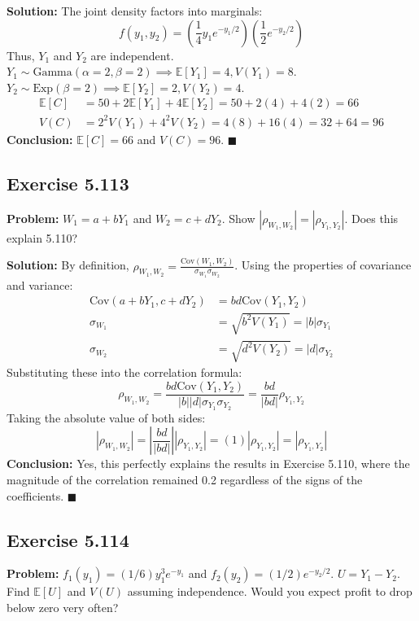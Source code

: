 \documentclass[11pt, a4paper]{article}
\theoremstyle{definition}
\theoremstyle{remark}
\newcommand{\E}{\mathbb{E}}
\begin{document}
\textbf{Solution:}
The joint density factors into marginals:
\[ f(y_1, y_2) = \left( \frac{1}{4} y_1 e^{-y_1/2} \right) \left( \frac{1}{2} e^{-y_2/2} \right) \]
Thus, $Y_1$ and $Y_2$ are independent.
$Y_1 \sim \text{Gamma}(\alpha=2, \beta=2) \implies \E[Y_1] = 4, V(Y_1) = 8$.
$Y_2 \sim \text{Exp}(\beta=2) \implies \E[Y_2] = 2, V(Y_2) = 4$.
\begin{align*}
\E[C] &= 50 + 2\E[Y_1] + 4\E[Y_2] = 50 + 2(4) + 4(2) = 66 \\
V(C) &= 2^2 V(Y_1) + 4^2 V(Y_2) = 4(8) + 16(4) = 32 + 64 = 96
\end{align*}
\textbf{Conclusion:} $\E[C] = 66$ and $V(C) = 96$. $\blacksquare$

\subsection{Exercise 5.113}
\textbf{Problem:} $W_1 = a + bY_1$ and $W_2 = c + dY_2$. Show $|\rho_{W_1, W_2}| = |\rho_{Y_1, Y_2}|$. Does this explain 5.110?

\textbf{Solution:}
By definition, $\rho_{W_1, W_2} = \frac{\text{Cov}(W_1, W_2)}{\sigma_{W_1} \sigma_{W_2}}$.
Using the properties of covariance and variance:
\begin{align*}
\text{Cov}(a + bY_1, c + dY_2) &= bd\text{Cov}(Y_1, Y_2) \\
\sigma_{W_1} &= \sqrt{b^2 V(Y_1)} = |b|\sigma_{Y_1} \\
\sigma_{W_2} &= \sqrt{d^2 V(Y_2)} = |d|\sigma_{Y_2}
\end{align*}
Substituting these into the correlation formula:
\[ \rho_{W_1, W_2} = \frac{bd\text{Cov}(Y_1, Y_2)}{|b||d|\sigma_{Y_1}\sigma_{Y_2}} = \frac{bd}{|bd|} \rho_{Y_1, Y_2} \]
Taking the absolute value of both sides:
\[ |\rho_{W_1, W_2}| = \left| \frac{bd}{|bd|} \right| |\rho_{Y_1, Y_2}| = (1) |\rho_{Y_1, Y_2}| = |\rho_{Y_1, Y_2}| \]
\textbf{Conclusion:} Yes, this perfectly explains the results in Exercise 5.110, where the magnitude of the correlation remained 0.2 regardless of the signs of the coefficients. $\blacksquare$

\subsection{Exercise 5.114}
\textbf{Problem:} $f_1(y_1) = (1/6)y_1^3 e^{-y_1}$ and $f_2(y_2) = (1/2)e^{-y_2/2}$. $U = Y_1 - Y_2$. Find $\E[U]$ and $V(U)$ assuming independence. Would you expect profit to drop below zero very often?
\end{document}

